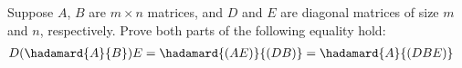 Suppose $A$, $B$ are $m \times n$ matrices, and $D$ and $E$ are diagonal matrices of size $m$ and $n$, respectively. Prove both parts of the following equality hold:
\begin{align*}
D(\hadamard{A}{B})E 
&= 
\hadamard{(AE)}{(DB)}=\hadamard{A}{(DBE)}
\end{align*}
